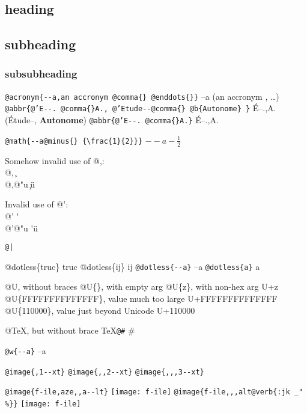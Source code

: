 \documentclass{book}
\newcommand{\GNUTexinfoplaceholder}[1]{}
\newcommand{\GNUTexinfonopagebreakheading}[2]{\let\clearpage\relax \let\cleardoublepage\relax \let\thispagestyle\GNUTexinfoplaceholder #1{#2}}
\renewcommand{\includegraphics}[1]{\fbox{FIG \detokenize{#1}}}
\begin{document}
\begin{titlepage}
\GNUTexinfonopagebreakheading{\section*}{{heading}}

\GNUTexinfonopagebreakheading{\subsection*}{{subheading}}

\GNUTexinfonopagebreakheading{\subsubsection*}{{subsubheading}}


\texttt{@acronym\{{-}{-}a,an accronym @comma\{\} @enddots\{\}\}} --a (an accronym , \dots{})
\texttt{@abbr\{@'E{-}{-}.\ @comma\{\}A.,\ @'Etude{-}{-}@comma\{\} @b\{Autonome\} \}} \'{E}--.\@ ,A.\@ (\'{E}tude--, \textbf{Autonome})
\texttt{@abbr\{@'E{-}{-}.\ @comma\{\}A.\}} \'{E}--.\@ ,A.\@

\texttt{@math\{{-}{-}a@minus\{\} \{\textbackslash{}frac\{1\}\{2\}\}\}} $--a- {\frac{1}{2}}$




Somehow invalid use of @,:\leavevmode{}\\
@, \c{}
\leavevmode{}\\
@,@"u \c{}\"{u}

Invalid use of @':\leavevmode{}\\
@' \'{}
\leavevmode{}\\
@'@"u \'{}\"{u}

\texttt{@|} 

@dotless\{truc\} truc
@dotless\{ij\} ij
\texttt{@dotless\{{-}{-}a\}} --a
\texttt{@dotless\{a\}} a

@U, without braces @U\{\}, with empty arg 
@U\{z\}, with non-hex arg U+z
@U\{FFFFFFFFFFFFFF\}, value much too large U+FFFFFFFFFFFFFF
@U\{110000\}, value just beyond Unicode U+110000

@TeX, but without brace \TeX{}\texttt{@\#} \#

\texttt{@w\{{-}{-}a\}} \hbox{--a}

\texttt{@image\{,1{-}{-}xt\}} 
\texttt{@image\{{,}{,}2{-}{-}xt\}} 
\texttt{@image\{{,}{,},3{-}{-}xt\}} 

\texttt{@image\{f-ile,aze{,}{,}a{-}{-}lt\}} \texttt{[image: f-ile]}
\texttt{@image\{f-ile{,}{,},alt@verb\{:jk \_" \%\@\}\}} \texttt{[image: f-ile]}


\end{titlepage}
\end{document}
